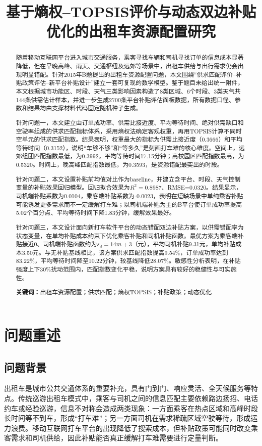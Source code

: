 \documentclass[12pt,a4paper]{ctexart}
\title{\bfseries 基于熵权--TOPSIS评价与动态双边补贴优化的出租车资源配置研究}
\author{}
\date{}
\begin{document}
\maketitle
\thispagestyle{empty}
\begin{abstract}
随着移动互联网平台进入城市交通服务，乘客寻找车辆和司机寻找订单的信息成本显著降低，但在早晚高峰、雨天、交通枢纽及远郊等场景中，出租车供给与出行需求仍会出现明显错配。针对2015年B题提出的出租车资源配置问题，本文围绕“供求匹配评价--补贴政策评估--新平台补贴设计”建立一套可复现的数学模型。鉴于题目未给出统一附件，本文根据城市功能区、时段、天气三类影响因素构造了8类区域、6个时段、3类天气共144条供需估计样本，并进一步生成2700条平台补贴评估面板数据，所有数据口径、参数和结果均由支撑材料代码固定随机种子生成。

针对问题一，本文建立由订单成功率、供需比接近度、平均等待时间、绝对供需缺口和空驶率组成的供求匹配指标体系，采用熵权法确定客观权重，再用TOPSIS计算不同时空单元的供求匹配指数。结果表明，权重最大的指标为供需比接近度（0.3666）和平均等待时间（0.3152），说明“车够不够”和“等多久”是刻画打车难的核心维度。空间上，远郊组团匹配指数最低，为0.3992，平均等待时间17.15分钟；高校园区匹配指数最高，为0.5320。时间上，晚高峰匹配指数最低，为0.3593，是资源错配最突出的时段。

针对问题二，本文设置补贴前均值对比作为baseline，并建立含平台、时段、天气控制变量的补贴效果回归模型。回归拟合效果为$R^2=0.8987$、RMSE=0.0320。结果显示，司机端补贴系数为0.0104，乘客端补贴系数为-0.0023，表明在短缺场景中单纯乘客补贴可能诱发更多需求而不一定缓解打车难；以司机端补贴为主的B平台使订单成功率提高5.02个百分点、平均等待时间下降1.83分钟，缓解效果最好。

针对问题三，本文设计面向新打车软件平台的动态错配双边补贴方案，以供需错配率为状态变量，在单均补贴成本约束下优化乘客补贴和司机补贴函数。最优方案为乘客端补贴接近0、司机端补贴函数约为$s_d=14m+3$（元），平均司机补贴9.31元，单均补贴成本3.50元。与无补贴基线相比，该方案供求匹配指数提高9.54\%，订单成功率达到83.22\%，平均等待时间降至10.22分钟，较基线降低28.07\%。敏感性分析表明，在补贴强度上下30\%扰动范围内，匹配指数变化平稳，说明方案具有较好的稳健性与可实施性。

\textbf{关键词：}出租车资源配置；供求匹配；熵权TOPSIS；补贴政策；动态优化
\end{abstract}
\newpage
\small
\tableofcontents
\normalsize
\newpage

\section{问题重述}
\subsection{问题背景}
出租车是城市公共交通体系的重要补充，具有门到门、响应灵活、全天候服务等特点。传统巡游出租车模式中，乘客与司机之间的信息匹配主要依赖路边扬招、电话约车或经验巡游，信息不对称会造成两类现象：一方面乘客在热点区域和高峰时段长时间等不到车，形成“打车难”；另一方面司机在需求稀疏区域空驶等待，形成运力浪费。移动互联网打车平台的出现降低了搜索成本，但补贴政策可能同时改变乘客需求和司机供给，因此补贴能否真正缓解打车难需要进行定量判断。
\end{document}
